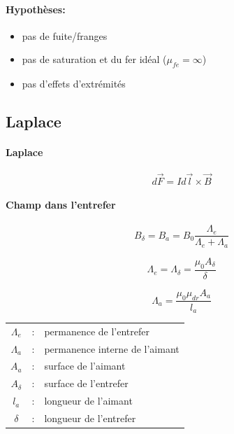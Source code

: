 \documentclass[a4paper,12pt,notitlepage]{article}
\begin{document}
    \paragraph{Hypothèses:}
    \begin{itemize}
        \item pas de fuite/franges
        \item pas de saturation et du fer idéal ($ \mu_{fe}=\infty $)
        \item pas d'effets d'extrémités
    \end{itemize}


    \subsection{Laplace}
    \paragraph{Laplace}
    \begin{equation}
        d \vec{F} = I d \vec{l} \times \vec{B}
    \end{equation}

    \paragraph{Champ dans l'entrefer}
    \begin{equation}
        B_{\delta} = B_a = B_0 \frac{\Lambda_e}{\Lambda_e + \Lambda_a}
    \end{equation}

    \begin{equation}
        \Lambda_e = \Lambda_{\delta} = \frac{\mu_0 A_{\delta}}{\delta}
    \end{equation}

    \begin{equation}
        \Lambda_a = \frac{\mu_0 \mu_{dr} A_a}{l_a}
    \end{equation}

    \begin{table}[H]
        \begin{tabular}{c c l}
            $ \Lambda_e $ & : & permanence de l'entrefer \\
            $ \Lambda_a $ & : & permanence interne de l'aimant \\
            $ A_a $ & : & surface de l'aimant \\
            $ A_{\delta} $ & : & surface de l'entrefer \\
            $ l_a $ & : & longueur de l'aimant \\
            $ \delta $ & : & longueur de l'entrefer \\
        \end{tabular}
    \end{table}
\end{document}
